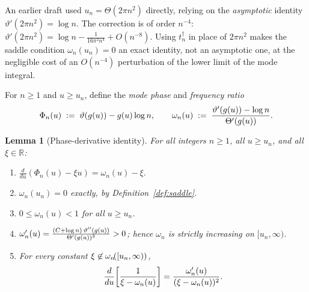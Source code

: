 \documentclass{amsart}
\newcommand{\assign}{:=}
\newcommand{\nin}{\not\in}
\newcommand{\tmem}[1]{{\em #1\/}}
\newcommand{\tmtextup}[1]{\text{{\upshape{#1}}}}
\newtheorem{lemma}{Lemma}
\begin{document}
\begin{remark}
  An earlier draft {\cite{bandlim-src}} used $u_n = \Theta (2 \pi n^2)$
  directly, relying on the {\tmem{asymptotic}} identity $\vartheta'  (2 \pi
  n^2) = \log n$. The correction is of order $n^{- 4}$: $\vartheta'  (2 \pi
  n^2) = \log n - \frac{1}{16 \pi^2 n^4} + O (n^{- 8})$. Using $t_n^{\dagger}$
  in place of $2 \pi n^2$ makes the saddle condition $\omega_n (u_n) = 0$ an
  exact identity, not an asymptotic one, at the negligible cost of an $O (n^{-
  4})$ perturbation of the lower limit of the mode integral.
\end{remark}

For $n \ge 1$ and $u \ge u_n$, define the {\tmem{mode phase}} and
{\tmem{frequency ratio}}
\begin{equation}
  \label{eq:Phi-omega} \Phi_n (u) \hspace{0.27em} \assign \hspace{0.27em}
  \vartheta (g (u)) - g (u) \log n, \qquad \omega_n (u) \hspace{0.27em}
  \assign \hspace{0.27em} \frac{\vartheta' (g (u)) - \log n}{\Theta' (g (u))}
  .
\end{equation}
\begin{lemma}
  [Phase-derivative identity]\label{lem:phase} For all integers $n \ge 1$, all
  $u \ge u_n$, and all $\xi \in \mathbb{R}$:
  \begin{enumerate}
    \item[\tmtextup{(a)}] $\frac{d}{du}  (\Phi_n (u) - \xi u) = \omega_n (u) -
    \xi$.
    
    \item[\tmtextup{(b)}] $\omega_n (u_n) = 0$ {\tmem{exactly}}, by
    Definition~\ref{def:saddle}.
    
    \item[\tmtextup{(c)}] $0 \le \omega_n (u) < 1$ for all $u \ge u_n$.
    
    \item[\tmtextup{(d)}] $\omega_n' (u) = \frac{(C + \log n)  \hspace{0.17em}
    \vartheta'' (g (u))}{\Theta' (g (u))^3} > 0$; hence $\omega_n$ is strictly
    increasing on $[u_n, \infty)$.
    
    \item[\tmtextup{(e)}] For every constant $\xi \nin \omega_n
    \hspace{-0.17em} ([u_n, \infty))$,
    \[ \frac{d}{du} \hspace{-0.17em} \left[ \frac{1}{\xi - \omega_n (u)}
       \right] = \frac{\omega_n' (u)}{(\xi - \omega_n (u))^2} . \]
  \end{enumerate}
\end{lemma}
\end{document}
